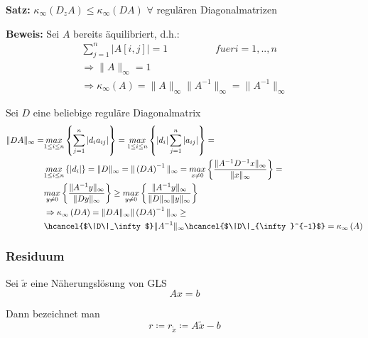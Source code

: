 \textbf{Satz:}
$\kappa_\infty\left(D_zA\right) \leq \kappa_\infty\left(DA\right)$ \hspace{2cm} $\forall$ regulären Diagonalmatrizen

\textbf{Beweis:}
Sei $A$ bereits äquilibriert, d.h.:
\begin{equation*}
  \begin{aligned}
    \sum\limits_{j=1}^{n}{\left|A\left[i,j\right]\right|} = 1 \hspace{2cm} fuer i = 1, .., n \\
	  \Rightarrow \|A\|_\infty = 1 \\
	  \Rightarrow \kappa_\infty\left(A\right) = \|A\|_\infty \|A^{-1}\|_\infty = \|A^{-1}\|_\infty
	\end{aligned}
\end{equation*}

Sei $D$ eine beliebige reguläre Diagonalmatrix
\begin{equation*}
\begin{aligned}
  \|DA\|_\infty = &\underset{1 \leq i \leq n}{max} \left\{\sum\limits_{j=1}^{n}{\left|d_ia_{ij}\right|}\right\} =
  \underset{1 \leq i \leq n}{max}\left\{\left|d_i\right|\sum\limits_{j=1}^{n}{\left|a_{ij}\right|}\right\} = \\
  &\underset{1 \leq i \leq n}{max}\left\{\left|d_i\right|\right\} = \|D\|_\infty = 
  \|\left(DA\right)^{-1}\|_\infty = \underset{x \neq 0}{max}\left\{\frac{\|A^{-1}D^{-1}x\|_\infty}{\|x\|_\infty}\right\} = \\
  &\underset{y \neq 0}{max}\left\{\frac{\|A^{-1}y\|_\infty}{\|Dy\|_\infty}\right\} \geq \underset{y \neq 0}{max}\left\{\frac{\|A^{-1}y\|_\infty}{\|D\|_\infty\|y\|_\infty}   \right\} \\
  &\Rightarrow \kappa_\infty\left(DA\right) = \|DA\|_\infty \|\left(DA\right)^{-1}\|_\infty \geq \\
  &\hcancel{$\|D\|_\infty$} \|A^{-1}\|_\infty \hcancel{$\|D\|_{\infty}^{-1}$} = \kappa_\infty\left(A\right)
\end{aligned}
\end{equation*}

\subsubsection{Residuum}
Sei $\widetilde
{x}$ eine Näherungslösung von GLS
\begin{equation*}
Ax=b
\end{equation*}

Dann bezeichnet man
\begin{equation*}
r \coloneqq r_{\widetilde{x}} \coloneqq A\widetilde{x} - b
\end{equation*}

